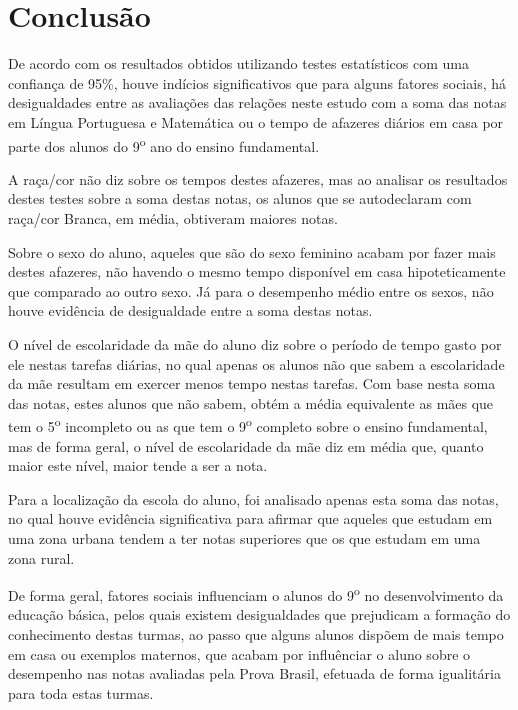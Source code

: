 
\chapter{Conclusão}

De acordo com os resultados obtidos utilizando testes estatísticos com uma confiança de 95\%, 
houve indícios significativos que para alguns fatores sociais,
há desigualdades entre as avaliações das relações neste estudo com a soma das notas em Língua
Portuguesa e Matemática ou o tempo de afazeres diários em casa por parte dos alunos do 9\textsuperscript{o} ano
do ensino fundamental.

A raça/cor não diz sobre os tempos destes afazeres, mas ao analisar os resultados destes testes sobre a soma destas notas,
os alunos que se autodeclaram com raça/cor Branca, em média, obtiveram maiores notas.

Sobre o sexo do aluno, aqueles que são do sexo feminino acabam por fazer mais destes afazeres, não havendo
o mesmo tempo disponível em casa hipoteticamente que comparado ao outro sexo. Já para o desempenho médio entre os sexos,
não houve evidência de desigualdade entre a soma destas notas. 

O nível de escolaridade da mãe do aluno diz sobre o período de tempo gasto por ele nestas tarefas diárias,
no qual apenas os alunos não que sabem a escolaridade da mãe resultam em exercer menos tempo nestas tarefas.
Com base nesta soma das notas, estes alunos que não sabem, obtém a média equivalente as mães que tem o 5\textsuperscript{o}
incompleto ou as que tem o 9\textsuperscript{o} completo sobre o ensino fundamental, mas de forma geral,
o nível de escolaridade da mãe diz em média que, quanto maior este nível, maior tende a ser a nota.

Para a localização da escola do aluno, foi analisado apenas esta soma das notas, no qual houve evidência
significativa para afirmar que aqueles que estudam em uma zona urbana tendem a ter notas superiores que os
que estudam em uma zona rural. 

De forma geral, fatores sociais influenciam o alunos do 9\textsuperscript{o} no desenvolvimento da educação básica,
pelos quais existem desigualdades que prejudicam a formação do conhecimento destas turmas,
ao passo que alguns alunos dispõem de mais tempo em casa ou exemplos maternos, que acabam por influênciar o aluno sobre o 
desempenho nas notas avaliadas pela Prova Brasil, efetuada de forma igualitária para toda estas turmas.

